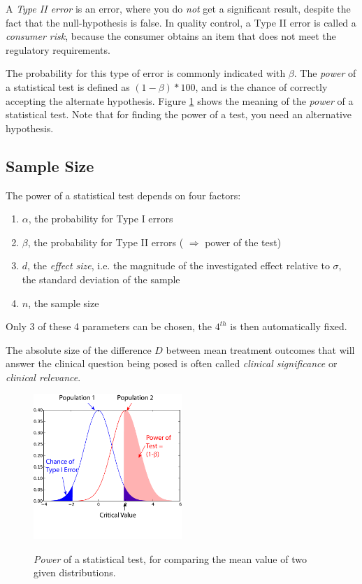 A \emph{Type II error} is an error, where you do \emph{not} get a significant result, despite the fact that the null-hypothesis is false.  In quality control, a Type II error is called a \emph{consumer risk}, because the consumer obtains an item that does not meet the regulatory requirements.

The probability for this type of error is commonly indicated with $\beta$. The \emph{power} of a statistical test is defined as $(1-\beta)*100$, and is the chance of correctly accepting the alternate hypothesis. Figure \ref{fig:power1} shows the meaning of the \emph{power} of a statistical test. Note that for finding the power of a test, you need an alternative hypothesis.

\subsection{Sample Size}
The power of a statistical test depends on four factors:

\begin{enumerate}
  \item  $\alpha$, the probability for Type I errors
  \item  $\beta$, the probability for Type II errors ( $\Rightarrow$ power of the test)
  \item  $d$, the \emph{effect size}, i.e. the magnitude of the investigated effect relative to $\sigma$, the standard deviation of the sample
  \item  $n$, the sample size
\end{enumerate}

Only 3 of these 4 parameters can be chosen, the $4^{th}$ is then automatically fixed.

The absolute size of the difference $D$ between mean treatment outcomes that will answer the clinical question being posed is often called \emph{clinical significance} or \emph{clinical relevance}.

\begin{figure}[!ht]
  \centering
  \includegraphics[width=0.5\textwidth]{../Images/power1.png}\\
  \caption{\emph{Power} of a statistical test, for comparing the mean value of two given distributions.}\label{fig:power1}
\end{figure}

